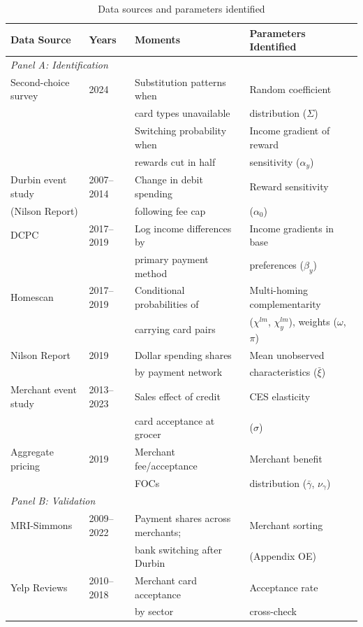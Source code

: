 \begin{table}[ht]
\centering
\caption{Data sources and parameters identified\label{tab:data-coverage}}
\footnotesize
\setlength{\tabcolsep}{4pt}
\begin{tabular}{llll}
\toprule
Data Source & Years & Moments & Parameters Identified \\
\midrule
\multicolumn{4}{l}{\textit{Panel A: Identification}} \\[3pt]
Second-choice survey & 2024 & Substitution patterns when & Random coefficient \\
 & & card types unavailable & distribution ($\Sigma$) \\[3pt]
 & & Switching probability when & Income gradient of reward \\
 & & rewards cut in half & sensitivity ($\alpha_y$) \\[3pt]
 Durbin event study & 2007--2014 & Change in debit spending & Reward sensitivity \\
(Nilson Report) & & following fee cap & ($\alpha_0$) \\[3pt]
DCPC & 2017--2019 & Log income differences by & Income gradients in base \\
 & & primary payment method & preferences ($\beta_y$) \\[3pt]
Homescan & 2017--2019 & Conditional probabilities of & Multi-homing complementarity \\
 & & carrying card pairs & ($\chi^{lm}$, $\chi^{lm}_y$), weights ($\omega$, $\pi$) \\[3pt]
Nilson Report & 2019 & Dollar spending shares & Mean unobserved \\
 & & by payment network & characteristics ($\bar{\xi}$) \\[3pt]
Merchant event study & 2013--2023 & Sales effect of credit & CES elasticity \\
 & & card acceptance at grocer & ($\sigma$) \\[3pt]
Aggregate pricing & 2019 & Merchant fee/acceptance & Merchant benefit \\
 & & FOCs & distribution ($\bar{\gamma}$, $\nu_\gamma$) \\[3pt]
\midrule
\multicolumn{4}{l}{\textit{Panel B: Validation}} \\[3pt]
MRI-Simmons & 2009--2022 & Payment shares across merchants; & Merchant sorting \\
 & & bank switching after Durbin & (Appendix OE) \\[3pt]
Yelp Reviews & 2010--2018 & Merchant card acceptance & Acceptance rate \\
 & & by sector & cross-check \\
\bottomrule
\end{tabular}
\end{table}
